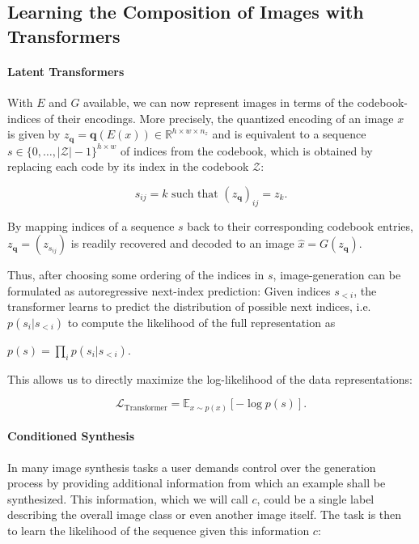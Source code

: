 \subsection{Learning the Composition of Images with Transformers}
\label{sec:trafo}

\paragraph{Latent Transformers} With $E$ and $G$ available, we can now represent images in terms of the codebook-indices of their encodings. More precisely, the quantized encoding of an image $x$ is given by
$z_{\mathbf{q}} = \mathbf{q}(E(x)) \in \mathbb{R}^{h \times w \times
n_z}$ and is equivalent to a sequence $s \in \{0, \dots, \vert \mathcal{Z} \vert - 1 \}^{h \times w}$ of indices from the codebook, which is obtained by replacing each code by its index in the codebook $\mathcal{Z}$:

\begin{equation}

  s_{ij} = k \text{ such that } \left( z_{\mathbf{q}} \right)_{ij} = z_k.
\label{eq:indexmap}
\end{equation}

By mapping indices of a sequence $s$ back to their corresponding codebook entries,
$z_{\mathbf{q}} = \left( z_{s_{ij}} \right)$ is readily recovered and decoded to an image $\hat{x} =
G(z_{\mathbf{q}})$.

Thus, after choosing some ordering of the indices in $s$, image-generation can be formulated as autoregressive next-index prediction: Given indices $s_{<i}$, the transformer learns to predict the distribution of possible next indices, i.e. $p(s_i \vert s_{<i})$ to compute the likelihood of the full representation as

$p(s)=\prod_i p(s_i \vert s_{<i})$.

This allows us to directly maximize the log-likelihood of the data representations:

\begin{equation}
  \mathcal{L}_{\text{Transformer}} = \mathbb{E}_{x \sim p(x)} \left[ -\log p(s) \right].
\end{equation}

\paragraph{Conditioned Synthesis}

In many image synthesis tasks a user demands control over the generation process by providing additional information from which an example shall be synthesized. This information, which we will call $c$, could be a single label describing the overall image class or even another image itself. The task is then to learn the likelihood of the sequence given this information $c$:

